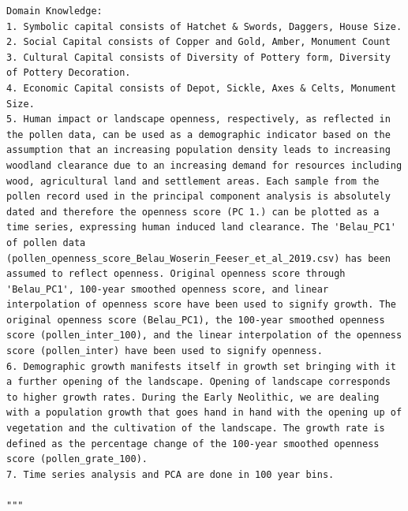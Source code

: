 \begin{verbatim}
Domain Knowledge: 
1. Symbolic capital consists of Hatchet & Swords, Daggers, House Size. 
2. Social Capital consists of Copper and Gold, Amber, Monument Count 
3. Cultural Capital consists of Diversity of Pottery form, Diversity of Pottery Decoration. 
4. Economic Capital consists of Depot, Sickle, Axes & Celts, Monument Size. 
5. Human impact or landscape openness, respectively, as reflected in the pollen data, can be used as a demographic indicator based on the assumption that an increasing population density leads to increasing woodland clearance due to an increasing demand for resources including wood, agricultural land and settlement areas. Each sample from the pollen record used in the principal component analysis is absolutely dated and therefore the openness score (PC 1.) can be plotted as a time series, expressing human induced land clearance. The 'Belau_PC1' of pollen data (pollen_openness_score_Belau_Woserin_Feeser_et_al_2019.csv) has been assumed to reflect openness. Original openness score through 'Belau_PC1', 100-year smoothed openness score, and linear interpolation of openness score have been used to signify growth. The original openness score (Belau_PC1), the 100-year smoothed openness score (pollen_inter_100), and the linear interpolation of the openness score (pollen_inter) have been used to signify openness.
6. Demographic growth manifests itself in growth set bringing with it a further opening of the landscape. Opening of landscape corresponds to higher growth rates. During the Early Neolithic, we are dealing with a population growth that goes hand in hand with the opening up of vegetation and the cultivation of the landscape. The growth rate is defined as the percentage change of the 100-year smoothed openness score (pollen_grate_100).
7. Time series analysis and PCA are done in 100 year bins.

"""
        \end{verbatim}



